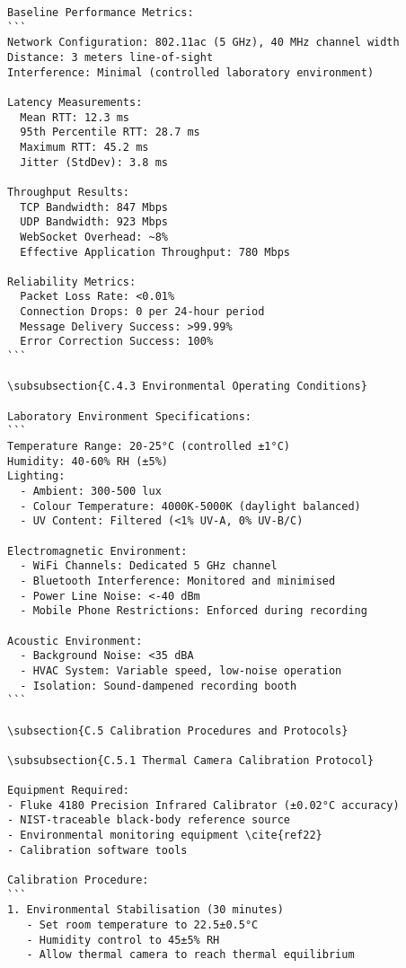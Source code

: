 \begin{verbatim}
Baseline Performance Metrics:
```
Network Configuration: 802.11ac (5 GHz), 40 MHz channel width
Distance: 3 meters line-of-sight
Interference: Minimal (controlled laboratory environment)

Latency Measurements:
  Mean RTT: 12.3 ms
  95th Percentile RTT: 28.7 ms
  Maximum RTT: 45.2 ms
  Jitter (StdDev): 3.8 ms

Throughput Results:
  TCP Bandwidth: 847 Mbps
  UDP Bandwidth: 923 Mbps
  WebSocket Overhead: ~8%
  Effective Application Throughput: 780 Mbps

Reliability Metrics:
  Packet Loss Rate: <0.01%
  Connection Drops: 0 per 24-hour period
  Message Delivery Success: >99.99%
  Error Correction Success: 100%
```

\subsubsection{C.4.3 Environmental Operating Conditions}

Laboratory Environment Specifications:
```
Temperature Range: 20-25°C (controlled ±1°C)
Humidity: 40-60% RH (±5%)
Lighting:
  - Ambient: 300-500 lux
  - Colour Temperature: 4000K-5000K (daylight balanced)
  - UV Content: Filtered (<1% UV-A, 0% UV-B/C)

Electromagnetic Environment:
  - WiFi Channels: Dedicated 5 GHz channel
  - Bluetooth Interference: Monitored and minimised
  - Power Line Noise: <-40 dBm
  - Mobile Phone Restrictions: Enforced during recording

Acoustic Environment:
  - Background Noise: <35 dBA
  - HVAC System: Variable speed, low-noise operation
  - Isolation: Sound-dampened recording booth
```

\subsection{C.5 Calibration Procedures and Protocols}

\subsubsection{C.5.1 Thermal Camera Calibration Protocol}

Equipment Required:
- Fluke 4180 Precision Infrared Calibrator (±0.02°C accuracy)
- NIST-traceable black-body reference source
- Environmental monitoring equipment \cite{ref22}
- Calibration software tools

Calibration Procedure:
```
1. Environmental Stabilisation (30 minutes)
   - Set room temperature to 22.5±0.5°C
   - Humidity control to 45±5% RH
   - Allow thermal camera to reach thermal equilibrium


\end{verbatim}

